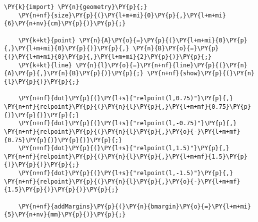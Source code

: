 \begin{Verbatim}[commandchars=\\\{\}]
    \PY{k}{import} \PY{n}{geometry}\PY{p}{;}
    \PY{n+nf}{size}\PY{p}{(}\PY{l+m+mi}{0}\PY{p}{,}\PY{l+m+mi}{6}\PY{n+nv}{cm}\PY{p}{)}\PY{p}{;}

    \PY{k+kt}{point} \PY{n}{A}\PY{o}{=}\PY{p}{(}\PY{l+m+mi}{0}\PY{p}{,}\PY{l+m+mi}{0}\PY{p}{)}\PY{p}{,} \PY{n}{B}\PY{o}{=}\PY{p}{(}\PY{l+m+mi}{0}\PY{p}{,}\PY{l+m+mi}{2}\PY{p}{)}\PY{p}{;}
    \PY{k+kt}{line} \PY{n}{l}\PY{o}{=}\PY{n+nf}{line}\PY{p}{(}\PY{n}{A}\PY{p}{,}\PY{n}{B}\PY{p}{)}\PY{p}{;} \PY{n+nf}{show}\PY{p}{(}\PY{n}{l}\PY{p}{)}\PY{p}{;}

    \PY{n+nf}{dot}\PY{p}{(}\PY{l+s}{"relpoint(l,0.75)"}\PY{p}{,} \PY{n+nf}{relpoint}\PY{p}{(}\PY{n}{l}\PY{p}{,}\PY{l+m+mf}{0.75}\PY{p}{)}\PY{p}{)}\PY{p}{;}
    \PY{n+nf}{dot}\PY{p}{(}\PY{l+s}{"relpoint(l,-0.75)"}\PY{p}{,} \PY{n+nf}{relpoint}\PY{p}{(}\PY{n}{l}\PY{p}{,}\PY{o}{-}\PY{l+m+mf}{0.75}\PY{p}{)}\PY{p}{)}\PY{p}{;}
    \PY{n+nf}{dot}\PY{p}{(}\PY{l+s}{"relpoint(l,1.5)"}\PY{p}{,} \PY{n+nf}{relpoint}\PY{p}{(}\PY{n}{l}\PY{p}{,}\PY{l+m+mf}{1.5}\PY{p}{)}\PY{p}{)}\PY{p}{;}
    \PY{n+nf}{dot}\PY{p}{(}\PY{l+s}{"relpoint(l,-1.5)"}\PY{p}{,} \PY{n+nf}{relpoint}\PY{p}{(}\PY{n}{l}\PY{p}{,}\PY{o}{-}\PY{l+m+mf}{1.5}\PY{p}{)}\PY{p}{)}\PY{p}{;}

    \PY{n+nf}{addMargins}\PY{p}{(}\PY{n}{bmargin}\PY{o}{=}\PY{l+m+mi}{5}\PY{n+nv}{mm}\PY{p}{)}\PY{p}{;}
\end{Verbatim}
